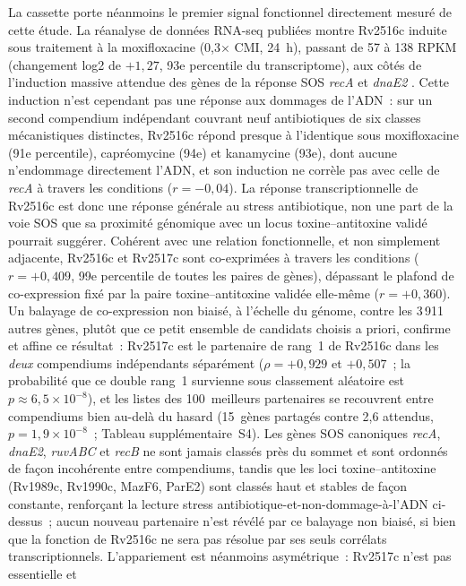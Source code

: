 \documentclass[11pt,a4paper]{article}
\begin{document}
La cassette porte néanmoins le premier signal fonctionnel directement mesuré de cette étude. La
réanalyse de données RNA-seq publiées montre Rv2516c induite sous traitement à la moxifloxacine
(0,3$\times$ CMI, 24~h), passant de 57 à 138 RPKM (changement log2 de $+1,27$, 93e percentile du
transcriptome), aux côtés de l'induction massive attendue des gènes de la réponse SOS \textit{recA}
et \textit{dnaE2} \citep{iacobino2021moxifloxacin}. Cette induction n'est cependant pas une réponse
aux dommages de l'ADN~: sur un second compendium indépendant couvrant neuf antibiotiques de six
classes mécanistiques distinctes, Rv2516c répond presque à l'identique sous moxifloxacine (91e
percentile), capréomycine (94e) et kanamycine (93e), dont aucune n'endommage directement l'ADN, et
son induction ne corrèle pas avec celle de \textit{recA} à travers les conditions ($r=-0,04$). La
réponse transcriptionnelle de Rv2516c est donc une réponse générale au stress antibiotique, non une
part de la voie SOS que sa proximité génomique avec un locus toxine--antitoxine validé pourrait
suggérer. Cohérent avec une relation fonctionnelle, et non simplement adjacente, Rv2516c et Rv2517c
sont co-exprimées à travers les conditions ($r=+0,409$, 99e percentile de toutes les paires de
gènes), dépassant le plafond de co-expression fixé par la paire toxine--antitoxine validée
elle-même ($r=+0,360$). Un balayage de co-expression non biaisé, à l'échelle du génome, contre les
3\,911 autres gènes, plutôt que ce petit ensemble de candidats choisis a priori, confirme et affine
ce résultat~: Rv2517c est le partenaire de rang~1 de Rv2516c dans les \emph{deux} compendiums
indépendants séparément ($\rho=+0,929$ et $+0,507$~; la probabilité que ce double rang~1 survienne
sous classement aléatoire est $p\approx6,5\times10^{-8}$), et les listes des 100~meilleurs
partenaires se recouvrent entre compendiums bien au-delà du hasard (15~gènes partagés contre 2,6
attendus, $p=1,9\times10^{-8}$~; Tableau supplémentaire~S4). Les gènes SOS canoniques \textit{recA}, \textit{dnaE2},
\textit{ruvABC} et \textit{recB} ne sont jamais classés près du sommet et sont ordonnés de façon
incohérente entre compendiums, tandis que les loci toxine--antitoxine (Rv1989c, Rv1990c, MazF6,
ParE2) sont classés haut et stables de façon constante, renforçant la lecture stress
antibiotique-et-non-dommage-à-l'ADN ci-dessus~; aucun nouveau partenaire n'est révélé par ce
balayage non biaisé, si bien que la fonction de Rv2516c ne sera pas résolue par ses seuls corrélats
transcriptionnels. L'appariement est néanmoins asymétrique~: Rv2517c n'est pas essentielle et
\end{document}
